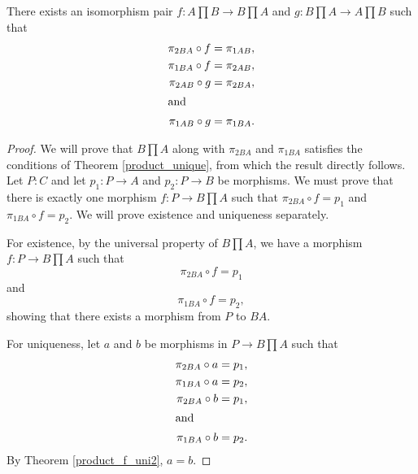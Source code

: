 \documentclass[../math.tex]{subfiles}
\begin{document}
\begin{theorem} \label{product_comm}
    There exists an isomorphism pair $f : A \prod B \to B \prod A$ and $g : B
    \prod A \to A \prod B$ such that
    \begin{align*}
        \pi_{2BA} \circ f &= \pi_{1AB}, \\
        \pi_{1BA} \circ f &= \pi_{2AB}, \\
        \pi_{2AB} \circ g &= \pi_{2BA}, \\
    \intertext{and}
        \pi_{1AB} \circ g &= \pi_{1BA}.
    \end{align*}
\end{theorem}
\begin{proof}
    We will prove that $B \prod A$ along with $\pi_{2BA}$ and $\pi_{1BA}$
    satisfies the conditions of Theorem \ref{product_unique}, from which the
    result directly follows.  Let $P : C$ and let $p_1 : P \to A$ and $p_2 : P
    \to B$ be morphisms.  We must prove that there is exactly one morphism $f :
    P \to B \prod A$ such that $\pi_{2BA} \circ f = p_1$ and $\pi_{1BA} \circ f
    = p_2$.  We will prove existence and uniqueness separately.

    For existence, by the universal property of $B \prod A$, we have a morphism
    $f : P \to B \prod A$ such that
    \[
        \pi_{2BA} \circ f = p_1
    \]
    and
    \[
        \pi_{1BA} \circ f = p_2,
    \]
    showing that there exists a morphism from $P$ to $BA$.

    For uniqueness, let $a$ and $b$ be morphisms in $P \to B \prod A$ such that
    \begin{align*}
        \pi_{2BA} \circ a &= p_1, \\
        \pi_{1BA} \circ a &= p_2, \\
        \pi_{2BA} \circ b &= p_1, \\
    \intertext{and}
        \pi_{1BA} \circ b &= p_2.
    \end{align*}
    By Theorem \ref{product_f_uni2}, $a = b$.
\end{proof}
\end{document}

